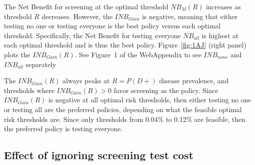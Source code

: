 \documentclass[AMA,STIX1COL]{WileyNJD-v2}
\begin{document}
The Net Benefit for screening at the optimal threshold $N\!B_M(R)$ increases as threshold $R$ decreases.  However, the $I\!N\!B_{Gain}$ is negative, meaning that either testing no one or testing everyone is the best policy versus each optimal threshold.  Specifically, the Net Benefit for testing everyone $N\!B_{all}$ is highest at each optimal threshold and is thus the best policy.  Figure~\ref{fig:1AJ} (right panel) plots the $I\!N\!B_{Gain}(R)$.  See Figure~1 of the WebAppendix to see $I\!N\!B_{none}$ and $I\!N\!B_{all}$ separately 

The $I\!N\!B_{Gain}(R)$ always peaks at $R=P(D+)$ disease prevalence, and thresholds where $I\!N\!B_{Gain}(R)>0$ favor screening as the policy.  Since $I\!N\!B_{Gain}(R)$ is negative at all optimal risk thresholds, then either testing no one or testing all are the preferred policies, depending on what the feasible optimal risk thresholds are.  Since only thresholds from 0.04\% to 0.12\% are feasible, then the preferred policy is testing everyone.



\subsection{Effect of ignoring screening test cost}
\label{sec:IgnoreScreeningTestCost}
\end{document}
